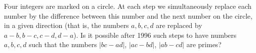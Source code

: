 Four integers are marked on a circle. At each step we simultaneously replace each number by the difference between this number and the next number on the circle, in a given direction (that is, the numbers $a, b, c, d$ are replaced by $a - b, b - c, c - d, d - a$). Is it possible after 1996 such steps to have numbers $a, b, c, d$ such that the numbers $|bc - ad|$, $|ac - bd|$, $|ab - cd|$ are primes?
